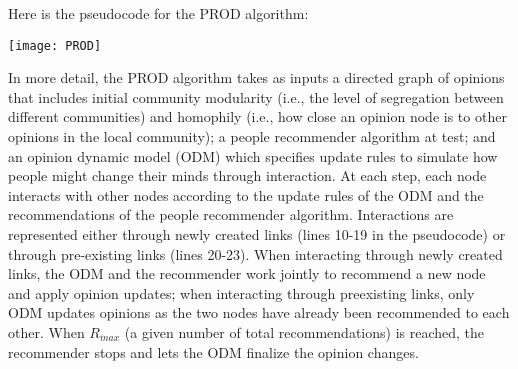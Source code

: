 \documentclass[10pt]{article}
\begin{document}

\vspace{5mm} %
\noindent Here is the pseudocode for the PROD algorithm: 

    \texttt{[image: PROD]}


\indent 

In more detail, the PROD algorithm takes as inputs a directed graph of opinions that includes initial community modularity (i.e., the level of segregation between different communities) and homophily (i.e., how close an opinion node is to other opinions in the local community); a people recommender algorithm at test; and an opinion dynamic model (ODM) which specifies update rules to simulate how people might change their minds through interaction. At each step, each node interacts with other nodes according to the update rules of the ODM and the recommendations of the people recommender algorithm. Interactions are represented either through newly created links (lines 10-19 in the pseudocode) or through pre-existing links (lines 20-23). When interacting through newly created links, the ODM and the recommender work jointly to recommend a new node and apply opinion updates; when interacting through preexisting links, only ODM updates opinions as the two nodes have already been recommended to each other. When $R_{max}$ (a given number of total recommendations) is reached, the recommender stops and lets the ODM finalize the opinion changes. 


\vspace{5mm} %
\end{document}

